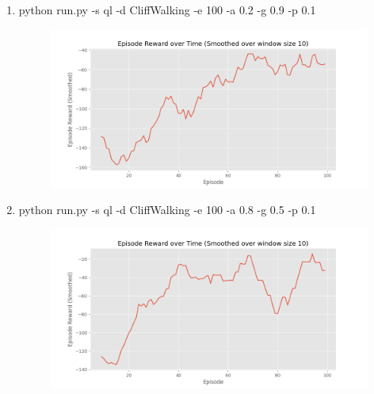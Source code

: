 \documentclass[a4paper]{article}
\theoremstyle{definition}
\begin{document}
\begin{enumerate}
    \item  python run.py -s ql -d CliffWalking -e 100 -a 0.2 -g 0.9 -p 0.1
            \begin{figure}[H]
                \centering
                \includegraphics[width=6in]{3_1_EROT.png}
                \label{fig:gan_q1_loss}
            \end{figure}
            
    \item  python run.py -s ql -d CliffWalking -e 100 -a 0.8 -g 0.5 -p 0.1  
            \begin{figure}[H]
                \centering
                \includegraphics[width=6in]{3_2_EROT.png}
                \label{fig:gan_q1_loss}
            \end{figure}
    

\end{enumerate}
\end{document}
